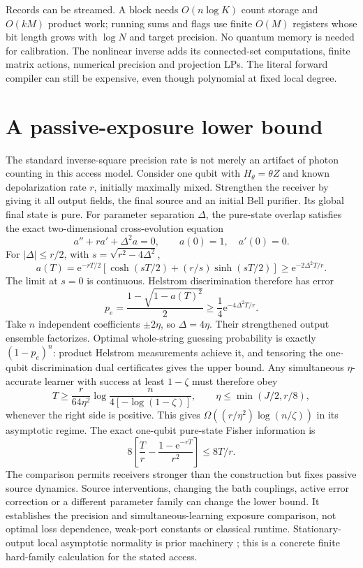 \documentclass[11pt]{article}
\newcommand{\ee}{\mathrm e}
\begin{document}
Records can be streamed. A block needs \(O(n\log K)\) count storage and \(O(kM)\) product work; running sums and flags use finite \(O(M)\) registers whose bit length grows with \(\log N\) and target precision. No quantum memory is needed for calibration. The nonlinear inverse adds its connected-set computations, finite matrix actions, numerical precision and projection LPs. The literal forward compiler can still be expensive, even though polynomial at fixed local degree.

\section{A passive-exposure lower bound}
The standard inverse-square precision rate is not merely an artifact of photon counting in this access model. Consider one qubit with \(H_\theta=\theta Z\) and known depolarization rate \(r\), initially maximally mixed. Strengthen the receiver by giving it all output fields, the final source and an initial Bell purifier. Its global final state is pure. For parameter separation \(\Delta\), the pure-state overlap satisfies the exact two-dimensional cross-evolution equation
\[
 a''+ra'+\Delta^2a=0,\qquad a(0)=1,\quad a'(0)=0.
\]
For \(|\Delta|\le r/2\), with \(s=\sqrt{r^2-4\Delta^2}\),
\[
 a(T)=\ee^{-rT/2}\left[\cosh(sT/2)+(r/s)\sinh(sT/2)\right]
 \ge\ee^{-2\Delta^2T/r}.
\]
The limit at \(s=0\) is continuous. Helstrom discrimination therefore has error
\[
 p_e=\frac{1-\sqrt{1-a(T)^2}}2\ge\frac14\ee^{-4\Delta^2T/r}.
\]
Take \(n\) independent coefficients \(\pm2\eta\), so \(\Delta=4\eta\). Their strengthened output ensemble factorizes. Optimal whole-string guessing probability is exactly \((1-p_e)^n\): product Helstrom measurements achieve it, and tensoring the one-qubit discrimination dual certificates gives the upper bound. Any simultaneous \(\eta\)-accurate learner with success at least \(1-\zeta\) must therefore obey
\[
 T\ge\frac r{64\eta^2}
 \log\frac{n}{4[-\log(1-\zeta)]},\qquad\eta\le\min(J/2,r/8),
\]
whenever the right side is positive. This gives \(\Omega((r/\eta^2)\log(n/\zeta))\) in its asymptotic regime. The exact one-qubit pure-state Fisher information is
\[
 8\left[\frac Tr-\frac{1-\ee^{-rT}}{r^2}\right]\le8T/r.
\]
The comparison permits receivers stronger than the construction but fixes passive source dynamics. Source interventions, changing the bath couplings, active error correction or a different parameter family can change the lower bound. It establishes the precision and simultaneous-learning exposure comparison, not optimal loss dependence, weak-port constants or classical runtime. Stationary-output local asymptotic normality is prior machinery \cite{guta}; this is a concrete finite hard-family calculation for the stated access.
\end{document}
